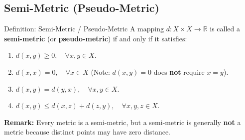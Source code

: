 \documentclass[11pt,a4paper]{article}
\begin{document}
\subsection{Semi-Metric (Pseudo-Metric)}

\begin{defbox}{Definition: Semi-Metric / Pseudo-Metric}
A mapping $d: X \times X \to \mathbb{R}$ is called a \textbf{semi-metric} (or \textbf{pseudo-metric}) if and only if it satisfies:
\begin{enumerate}
    \item[\textbf{[M1]}] $d(x, y) \ge 0, \quad \forall x, y \in X$.
    \item[\textbf{[M2']}] $d(x, x) = 0, \quad \forall x \in X$ (Note: $d(x, y) = 0$ does \textbf{not} require $x = y$).
    \item[\textbf{[M3]}] $d(x, y) = d(y, x), \quad \forall x, y \in X$.
    \item[\textbf{[M4]}] $d(x, y) \le d(x, z) + d(z, y), \quad \forall x, y, z \in X$.
\end{enumerate}
\textbf{Remark:} Every metric is a semi-metric, but a semi-metric is generally \textbf{not} a metric because distinct points may have zero distance.
\end{defbox}
\end{document}
